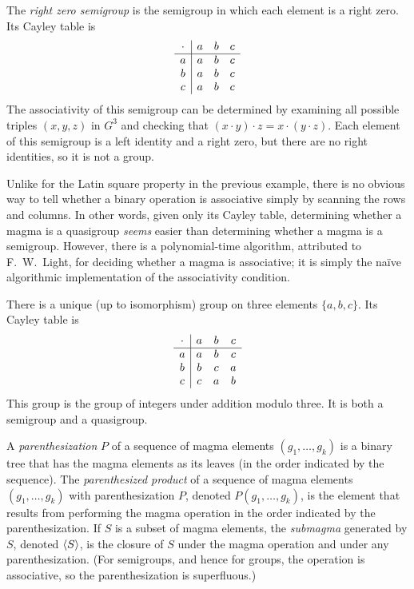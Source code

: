 \begin{example}\label{ex:zero}
  The \emph{right zero semigroup} is the semigroup in which each element is a right zero.
  Its Cayley table is
  \begin{equation*}
    \begin{array}{c | c c c}
      \cdot & a & b & c \\
      \hline
      a & a & b & c \\
      b & a & b & c \\
      c & a & b & c \\
    \end{array}
  \end{equation*}
  The associativity of this semigroup can be determined by examining all possible triples $(x, y, z)$ in $G^3$ and checking that $(x \cdot y) \cdot z = x \cdot (y \cdot z)$.
  Each element of this semigroup is a left identity and a right zero, but there are no right identities, so it is not a group.

  Unlike for the Latin square property in the previous example, there is no obvious way to tell whether a binary operation is associative simply by scanning the rows and columns.
  In other words, given only its Cayley table, determining whether a magma is a quasigroup \emph{seems} easier than determining whether a magma is a semigroup.
  However, there is a polynomial-time algorithm, attributed to F.~W.~Light, for deciding whether a magma is associative; it is simply the naïve algorithmic implementation of the associativity condition.
\end{example}

\begin{example}
  There is a unique (up to isomorphism) group on three elements $\{a, b, c\}$.
  Its Cayley table is
  \begin{equation*}
    \begin{array}{c | c c c}
      \cdot & a & b & c \\
      \hline
      a & a & b & c \\
      b & b & c & a \\
      c & c & a & b \\
    \end{array}
  \end{equation*}
  This group is the group of integers under addition modulo three.
  It is both a semigroup and a quasigroup.
\end{example}

A \emph{parenthesization} $P$ of a sequence of magma elements $(g_1, \dotsc, g_k)$ is a binary tree that has the magma elements as its leaves (in the order indicated by the sequence).
The \emph{parenthesized product} of a sequence of magma elements $(g_1, \dotsc, g_k)$ with parenthesization $P$, denoted $P(g_1, \dotsc, g_k)$, is the element that results from performing the magma operation in the order indicated by the parenthesization.
If $S$ is a subset of magma elements, the \emph{submagma} generated by $S$, denoted $\langle S \rangle$, is the closure of $S$ under the magma operation and under any parenthesization.
(For semigroups, and hence for groups, the operation is associative, so the parenthesization is superfluous.)

